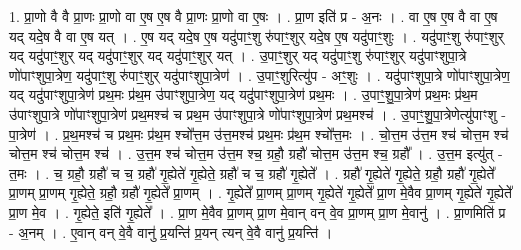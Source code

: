 \documentclass[17pt]{extarticle}
\begin{document}
1. प्रा॒णो वै वै प्रा॒णः प्रा॒णो वा ए॒ष ए॒ष वै प्रा॒णः प्रा॒णो वा ए॒षः । . प्रा॒ण इति॑ प्र - अ॒नः । . वा ए॒ष ए॒ष वै वा ए॒ष यद् यदे॒ष वै वा ए॒ष यत् । . ए॒ष यद् यदे॒ष ए॒ष यदु॑पाꣳ॒॒शु रु॑पाꣳ॒॒शुर् यदे॒ष ए॒ष यदु॑पाꣳ॒॒शुः । . यदु॑पाꣳ॒॒शु रु॑पाꣳ॒॒शुर् यद् यदु॑पाꣳ॒॒शुर् यद् यदु॑पाꣳ॒॒शुर् यद् यदु॑पाꣳ॒॒शुर् यत् । . उ॒पाꣳ॒॒शुर् यद् यदु॑पाꣳ॒॒शु रु॑पाꣳ॒॒शुर् यदु॑पाꣳशुपा॒त्रे णो॑पाꣳशुपा॒त्रेण॒ यदु॑पाꣳ॒॒शु रु॑पाꣳ॒॒शुर् यदु॑पाꣳशुपा॒त्रेण॑ । . उ॒पाꣳ॒॒शुरित्यु॑प - अꣳ॒॒शुः । . यदु॑पाꣳशुपा॒त्रे णो॑पाꣳशुपा॒त्रेण॒ यद् यदु॑पाꣳशुपा॒त्रेण॑ प्रथ॒मः प्र॑थ॒म उ॑पाꣳशुपा॒त्रेण॒ यद् यदु॑पाꣳशुपा॒त्रेण॑ प्रथ॒मः । . उ॒पाꣳ॒॒शु॒पा॒त्रेण॑ प्रथ॒मः प्र॑थ॒म उ॑पाꣳशुपा॒त्रे णो॑पाꣳशुपा॒त्रेण॑ प्रथ॒मश्च॑ च प्रथ॒म उ॑पाꣳशुपा॒त्रे णो॑पाꣳशुपा॒त्रेण॑ प्रथ॒मश्च॑ । . उ॒पाꣳ॒॒शु॒पा॒त्रेणेत्यु॑पाꣳशु - पा॒त्रेण॑ । . प्र॒थ॒मश्च॑ च प्रथ॒मः प्र॑थ॒म श्चो᳚त्त॒म उ॑त्त॒मश्च॑ प्रथ॒मः प्र॑थ॒म श्चो᳚त्त॒मः । . चो॒त्त॒म उ॑त्त॒म श्च॑ चोत्त॒म श्च॑ चोत्त॒म श्च॑ चोत्त॒म श्च॑ । . उ॒त्त॒म श्च॑ चोत्त॒म उ॑त्त॒म श्च॒ ग्रहौ॒ ग्रहौ॑ चोत्त॒म उ॑त्त॒म श्च॒ ग्रहौ᳚ । . उ॒त्त॒म इत्यु॑त् - त॒मः । . च॒ ग्रहौ॒ ग्रहौ॑ च च॒ ग्रहौ॑ गृ॒ह्येते॑ गृ॒ह्येते॒ ग्रहौ॑ च च॒ ग्रहौ॑ गृ॒ह्येते᳚ । . ग्रहौ॑ गृ॒ह्येते॑ गृ॒ह्येते॒ ग्रहौ॒ ग्रहौ॑ गृ॒ह्येते᳚ प्रा॒णम् प्रा॒णम् गृ॒ह्येते॒ ग्रहौ॒ ग्रहौ॑ गृ॒ह्येते᳚ प्रा॒णम् । . गृ॒ह्येते᳚ प्रा॒णम् प्रा॒णम् गृ॒ह्येते॑ गृ॒ह्येते᳚ प्रा॒ण मे॒वैव प्रा॒णम् गृ॒ह्येते॑ गृ॒ह्येते᳚ प्रा॒ण मे॒व । . गृ॒ह्येते॒ इति॑ गृ॒ह्येते᳚ । . प्रा॒ण मे॒वैव प्रा॒णम् प्रा॒ण मे॒वान् वन् वे॒व प्रा॒णम् प्रा॒ण मे॒वानु॑ । . प्रा॒णमिति॑ प्र - अ॒नम् । . ए॒वान् वन् वे॒वै वानु॑ प्र॒यन्ति॑ प्र॒यन् त्यन् वे॒वै वानु॑ प्र॒यन्ति॑ । \newline
\end{document}
